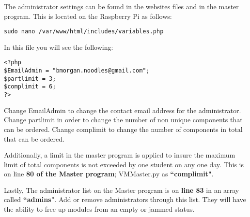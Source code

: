 \documentclass[a4paper,11pt]{article}
\numberwithin{figure}{section}
\numberwithin{table}{section}
\begin{document}
\begin{appendices}
The administrator settings can be found in the websites files and in the master program. This is located on the Raspberry Pi as follows:
\begin{lstlisting}
sudo nano /var/www/html/includes/variables.php
\end{lstlisting}
In this file you will see the following:
\begin{lstlisting}
<?php
$EmailAdmin = "bmorgan.noodles@gmail.com";
$partlimit = 3;
$complimit = 6;
?>
\end{lstlisting}
Change EmailAdmin to change the contact email address for the administrator. Change partlimit in order to change the number of non unique components that can be ordered. Change complimit to change the number of components in total that can be ordered.

Additionally, a limit in the master program is applied to insure the maximum limit of total components is not exceeded by one student on any one day. This is on line \textbf{80 of the Master program}; VMMaster.py as \textbf{``complimit"}.

Lastly, The administrator list on the Master program is on \textbf{line 83} in an array called \textbf{``admins"}. Add or remove administrators through this list. They will have the ability to free up modules from an empty or jammed status.



\end{appendices}
\end{document}
